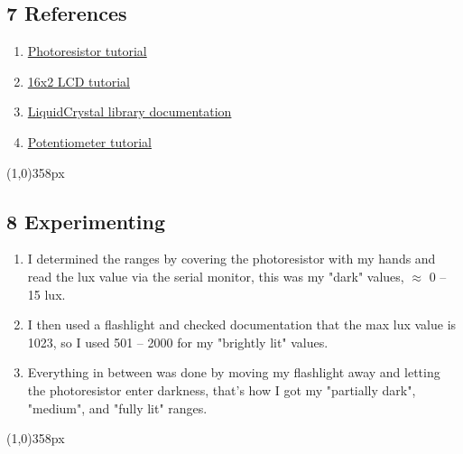 \documentclass{article}
\newcommand{\enterProblemHeader}[1]{
}
\newcommand{\exitProblemHeader}[1]{
}
\newcounter{partCounter}
\newcounter{homeworkProblemCounter}
\newenvironment{homeworkProblem}[1]{
    \setcounter{partCounter}{1}
}{
}
\newcommand{\hwline}{\begin{center}\line(1,0){358px}\end{center}}
\begin{document}

\begin{homeworkProblem}{}
    \subsection{7 References}
    \begin{enumerate}
        \item \vspace{-5pt}
        \href{https://projecthub.arduino.cc/tropicalbean/how-to-use-a-photoresistor-1143fd}
        {Photoresistor tutorial}
        \item \vspace{-5pt}
        \href{https://docs.arduino.cc/learn/electronics/lcd-displays/}
        {16x2 LCD tutorial}
        \item \vspace{-5pt}
        \href{https://www.arduino.cc/reference/en/libraries/liquidcrystal/}
        {LiquidCrystal library documentation}
        \item \vspace{-5pt}
        \href{https://roboticsbackend.com/arduino-potentiometer-complete-tutorial/}
        {Potentiometer tutorial}
    \end{enumerate}
    \hwline
\end{homeworkProblem}


\begin{homeworkProblem}{}
    \vspace{-20pt}\subsection{8 Experimenting}
    \begin{enumerate}
        \item \vspace{-5pt}
        I determined the ranges by covering the photoresistor with my hands and read the
        lux value via the serial monitor, this was my "dark" values, $\approx$
        0 -- 15 lux.
        \item \vspace{-5pt}
        I then used a flashlight and checked documentation that the max lux value is
        1023, so I used 501 -- 2000 for my "brightly lit" values.
        \item \vspace{-5pt}
        Everything in between was done by moving my flashlight away and letting the
        photoresistor enter darkness, that's how I got my "partially dark", "medium",
        and "fully lit" ranges.
    \end{enumerate}
    \hwline
\end{homeworkProblem}
\end{document}
